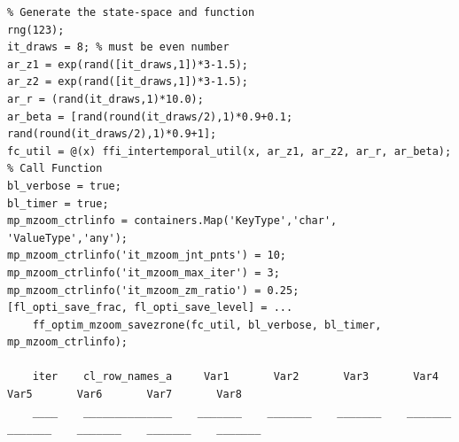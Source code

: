 \documentclass[
]{book}
\begin{document}
\begin{verbatim}
% Generate the state-space and function
rng(123);
it_draws = 8; % must be even number
ar_z1 = exp(rand([it_draws,1])*3-1.5);
ar_z2 = exp(rand([it_draws,1])*3-1.5);
ar_r = (rand(it_draws,1)*10.0);
ar_beta = [rand(round(it_draws/2),1)*0.9+0.1; rand(round(it_draws/2),1)*0.9+1]; 
fc_util = @(x) ffi_intertemporal_util(x, ar_z1, ar_z2, ar_r, ar_beta);
% Call Function
bl_verbose = true;
bl_timer = true;
mp_mzoom_ctrlinfo = containers.Map('KeyType','char', 'ValueType','any');
mp_mzoom_ctrlinfo('it_mzoom_jnt_pnts') = 10;
mp_mzoom_ctrlinfo('it_mzoom_max_iter') = 3;
mp_mzoom_ctrlinfo('it_mzoom_zm_ratio') = 0.25;
[fl_opti_save_frac, fl_opti_save_level] = ...
    ff_optim_mzoom_savezrone(fc_util, bl_verbose, bl_timer, mp_mzoom_ctrlinfo);

    iter    cl_row_names_a     Var1       Var2       Var3       Var4       Var5       Var6       Var7       Var8  
    ____    ______________    _______    _______    _______    _______    _______    _______    _______    _______


\end{verbatim}
\end{document}
